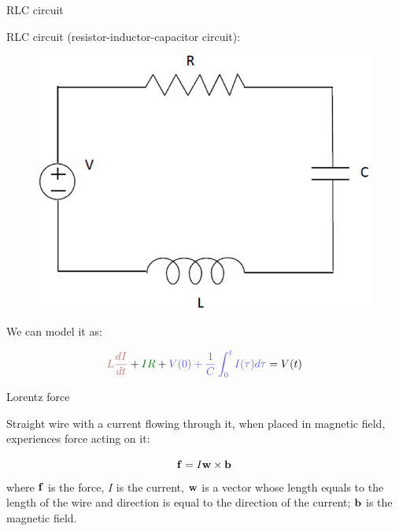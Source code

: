 \documentclass{beamer}
\begin{document}
\begin{frame}{RLC circuit}
	\begin{flushleft}
		
		RLC circuit (resistor-inductor-capacitor circuit):
		
		\begin{figure}
			\centering
			\includegraphics[width=0.4\linewidth]{RLC}
			\label{fig:Series-RL}
		\end{figure}
		
		We can model it as:
		
		\begin{equation}
			\textcolor{myred}{L \frac{dI}{dt}} + 
			\textcolor{mydarkgreen}{IR} + 
			\textcolor{myblue}{V(0) + \frac{1}{C} \int_0^t I(\tau) d\tau } = V(t)
		\end{equation}
		
	\end{flushleft}
\end{frame}





\begin{frame}{Lorentz force}
	\begin{flushleft}
		
		Straight wire with a current flowing through it, when placed in magnetic field, experiences force acting on it:
		
		\begin{equation}
			\mathbf{f} = I \mathbf{w} \times \mathbf{b}
		\end{equation}
		where $\mathbf{f}$ is the force, $I$ is the current, $\mathbf{w}$ is a vector whose length equals to the length of the wire and direction is equal to the direction of the current; $\mathbf{b}$ is the magnetic field.
		
	\end{flushleft}
\end{frame}
\end{document}
